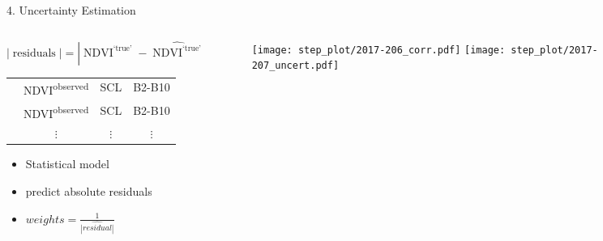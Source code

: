 \begin{frame}[t]{4. Uncertainty Estimation}
    \begin{columns}
        \begin{column}{0.45\textwidth}
              $$|\operatorname{residuals}| = |\operatorname{NDVI}^\text{`true'} - \widehat{\operatorname{NDVI}^\text{`true'}}|$$

            \small
            \begin{tabular}{| c |  c c c |}
                \hline
                \color{myred}{|residuals|}  & NDVI\textsuperscript{observed} & SCL & B2-B10    \\
                \color{myred}{|residuals|}  & NDVI\textsuperscript{observed} & SCL & B2-B10    \\
                \color{myred}{$\vdots$    } & $\vdots$ & $\vdots$  & $\vdots$ \\
            \end{tabular}\normalsize \vspace{0.5cm}

            \begin{itemize}
                \item Statistical model
                \item predict absolute residuals
                \item $weights = \frac{1}{\widehat{|residual|}}$
            \end{itemize}
        \end{column}
        \begin{column}{0.42\textwidth}
            \begin{figure}
                \vspace{-1.8cm}
                \texttt{[image: step\_plot/2017-206\_corr.pdf]}
                \texttt{[image: step\_plot/2017-207\_uncert.pdf]}
            \end{figure}
        \end{column}
    \end{columns}
\end{frame}

